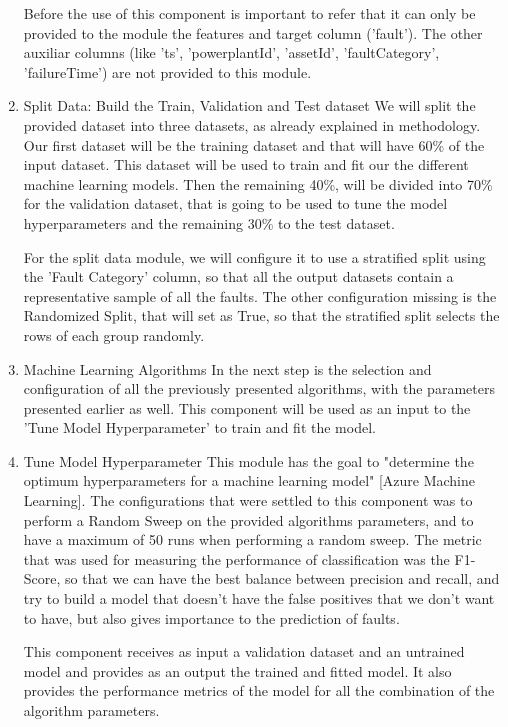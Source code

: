\begin{enumerate}
Before the use of this component is important to refer that it can only be provided to the module the features and target column ('fault'). The other auxiliar columns (like 'ts', 'powerplantId', 'assetId', 'faultCategory', 'failureTime') are not provided to this module.

    \item{Split Data: Build the Train, Validation and Test dataset}
We will split the provided dataset into three datasets, as already explained in methodology. Our first dataset will be the training dataset and that will have 60\% of the input dataset. This dataset will be used to train and fit our the different machine learning models. Then the remaining 40\%, will be divided into 70\% for the validation dataset, that is going to be used to tune the model hyperparameters and the remaining 30\% to the test dataset.

For the split data module, we will configure it to use a stratified split using the 'Fault Category' column, so that all the output datasets contain a representative sample of all the faults. The other configuration missing is the Randomized Split, that will set as True, so that the stratified split selects the rows of each group randomly.

    \item{Machine Learning Algorithms}
In the next step is the selection and configuration of all the previously presented algorithms, with the parameters presented earlier as well. This component will be used as an input to the 'Tune Model Hyperparameter' to train and fit the model.

    \item{Tune Model Hyperparameter}
This module has the goal to "determine the optimum hyperparameters for a machine learning model" [Azure Machine Learning]. The configurations that were settled to this component was to perform a Random Sweep on the provided algorithms parameters, and to have a maximum of 50 runs when performing a random sweep. The metric that was used for measuring the performance of classification was the F1-Score, so that we can have the best balance between precision and recall, and try to build a model that doesn't have the false positives that we don't want to have, but also gives importance to the prediction of faults.

This component receives as input a validation dataset and an untrained model and provides as an output the trained and fitted model. It also provides the performance metrics of the model for all the combination of the algorithm parameters.


\end{enumerate}
